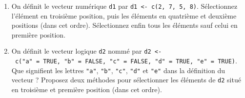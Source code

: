\documentclass[12pt,twosided, notitlepage]{book}
\newenvironment{Shaded}{}{}
\newcommand{\KeywordTok}[1]{\textcolor[rgb]{0.00,0.00,1.00}{#1}}
\newcommand{\DecValTok}[1]{#1}
\newcommand{\StringTok}[1]{\textcolor[rgb]{0.00,0.50,0.50}{#1}}
\newcommand{\CommentTok}[1]{\textcolor[rgb]{0.00,0.50,0.00}{#1}}
\newcommand{\OperatorTok}[1]{#1}
\newcommand{\NormalTok}[1]{#1}
\newif \ifsol
\renewenvironment{Shaded}{\begin{snugshade}}{\end{snugshade}}
\begin{document}
\begin{enumerate}
\def\labelenumi{\alph{enumi}.}
\item
  On définit le vecteur numérique \texttt{d1} par
  \texttt{d1\ \textless{}-\ c(2,\ 7,\ 5,\ 8)}. Sélectionnez l'élément en
  troisième position, puis les éléments en quatrième et deuxième
  positions (dans cet ordre). Sélectionnez enfin tous les éléments sauf
  celui en première position.\index{\texttt{[}}

  \ifsol 

  \begin{center} \rule{0.5\linewidth}{\linethickness}\end{center}

\begin{Shaded}
\begin{Highlighting}[]
\NormalTok{d1 <-}\StringTok{ }\KeywordTok{c}\NormalTok{(}\DecValTok{2}\NormalTok{, }\DecValTok{7}\NormalTok{, }\DecValTok{5}\NormalTok{, }\DecValTok{8}\NormalTok{)}
\NormalTok{d1}
\NormalTok{  ## [1] 2 7 5 8}

\CommentTok{# Sélection de l'élément en troisième position}
\NormalTok{d1[}\DecValTok{3}\NormalTok{]}
\NormalTok{  ## [1] 5}

\CommentTok{# Sélection des éléments en quatrième et en deuxième}
\CommentTok{# position (dans cet ordre)}
\NormalTok{d1[}\KeywordTok{c}\NormalTok{(}\DecValTok{4}\NormalTok{, }\DecValTok{2}\NormalTok{)]}
\NormalTok{  ## [1] 8 7}

\CommentTok{# Sélection de tous les éléments sauf celui en}
\CommentTok{# première position}
\NormalTok{d1[}\OperatorTok{-}\DecValTok{1}\NormalTok{]}
\NormalTok{  ## [1] 7 5 8}
\end{Highlighting}
\end{Shaded}

  \begin{center} \rule{0.5\linewidth}{\linethickness}\end{center}

  \bigskip  \fi 
\item
  On définit le vecteur logique \texttt{d2} nommé par
  \texttt{d2\ \textless{}-\ c("a"\ =\ TRUE,\ "b"\ =\ FALSE,\ "c"\ =\ FALSE,\ "d"\ =\ TRUE,\ "e"\ =\ TRUE)}.
  Que signifient les lettres \texttt{"a"}, \texttt{"b"}, \texttt{"c"},
  \texttt{"d"} et \texttt{"e"} dans la définition du vecteur ? Proposez
  deux méthodes pour sélectionner les éléments de \texttt{d2} situé en
  troisième et première position (dans cet ordre).\index{\texttt{[}}

  \ifsol 


\end{enumerate}
\end{document}
